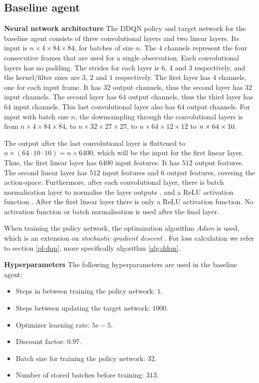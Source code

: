 \subsection{Baseline agent}\label{appendix-baseline-pong}
\textbf{Neural network architecture}\newline
\noindent The DDQN policy and target network for the baseline agent consists of three convolutional layers and two linear layers. Its input is $n \times 4 \times 84 \times 84$, for batches of size $n$. The $4$ channels represent the four consecutive frames that are used for a single observation. Each convolutional layers has no padding. The strides for each layer is $6$, $4$ and $3$ respectively, and the kernel/filter sizes are $3$, $2$ and $1$ respectively. The first layer has 4 channels, one for each input frame. It has $32$ output channels, thus the second layer has $32$ input channels. The second layer has $64$ output channels, thus the third layer has $64$ input channels. This last convolutional layer also has $64$ output channels. For input with batch size $n$, the downsampling through the convolutional layers is from $n \times 4 \times 84 \times 84$, to $n \times 32 \times 27 \times 27$, to $n \times 64 \times 12 \times 12$ to $n \times 64 \times 10 \time 10$. 

The output after the last convolutional layer is flattened to $n \times (64 \cdot 10 \cdot 10) = n \times 6400$, which will be the input for the first linear layer. Thus, the first linear layer has $6400$ input features. It has $512$ output features. The second linear layer has $512$ input features and $6$ output features, covering the action-space. Furthermore, after each convolutional layer, there is batch normalisation layer to normalise the layer outputs \cite{batchnorm}, and a ReLU activation function \cite{relu}. After the first linear layer there is only a ReLU activation function. No activation function or batch normalisation is used after the final layer.

When training the policy network, the optimization algorithm \emph{Adam} is used, which is an extension on \emph{stochastic gradient descent} \cite{adam}. For loss calculation we refer to section \ref{pl-dqn}, more specifically algorithm \ref{alg:ddqn}.

\noindent\textbf{Hyperparameters}\newline
\noindent The following hyperparameters are used in the baseline agent:
\begin{itemize}
\item Steps in between training the policy network: $1$.
\item Steps between updating the target network: $1000$.
\item Optimizer learning rate: $5e-5$.
\item Discount factor: $0.97$.
\item Batch size for training the policy network: $32$.
\item Number of stored batches before training: $313$.
\end{itemize}

